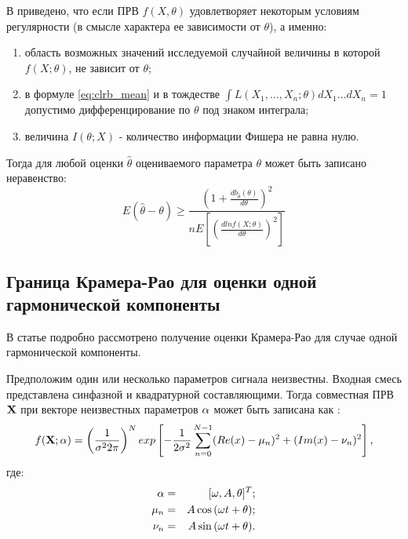 В \cite{ayvazyan-book} приведено, что если  ПРВ ${f(X, \theta)}$  
удовлетворяет некоторым  условиям регулярности (в смысле характера ее зависимости от ${\theta}$), а именно:
\begin{enumerate}
\item область возможных значений исследуемой случайной величины в которой ${f(X; \theta)}$, не зависит от ${\theta}$;
\item в формуле \ref{eq:clrb_mean} и в тождестве ${\int L(X_1, ..., X_n;\theta) dX_1...dX_n = 1}$ допустимо дифференцирование по ${\theta}$ под знаком интеграла;
\item величина ${I(\theta; X)}$ - количество информации Фишера не равна нулю.
\end{enumerate}

Тогда для любой оценки ${\hat{\theta}}$ оцениваемого параметра ${\theta}$ может быть записано неравенство:
\begin{equation}
	\label{eq:crlb_base3}
	E(\hat{\theta} - \theta) \ge \frac{(1 + \frac{d b_{\hat{\theta}} (\theta)}{d \theta})^2}{n E \left[ \left( \frac{d ln f(X; \theta)}{d \theta} \right)^2 \right]}
\end{equation}

\subsection{Граница Крамера-Рао для оценки одной гармонической компоненты}
В статье \cite{rife-crlb-article} подробно рассмотрено получение оценки Крамера-Рао для случае одной гармонической компоненты.

Предположим один или несколько параметров сигнала неизвестны. Входная смесь представлена синфазной и квадратурной составляющими. Тогда совместная ПРВ ${\bf{X}}$
при векторе неизвестных параметров ${\bf{\alpha}}$  может быть записана как \cite{rife-crlb-article}:
\begin{equation}
	\label{eq:clrb_pdf}
	f({\bf{X}}; {\bf{\alpha}}) = \left( \frac{1}{\sigma^2 2 \pi} \right)^N exp \left[ -\frac{1}{2\sigma^2} \sum_{n=0}^{N-1} (Re(x)-\mu_n)^2 + (Im(x) - \nu_n)^2 \right],
\end{equation}
где:
\begin{eqnarray}
	\label{eq:clrb_alpha}
	{\bf{\alpha}} & = & [\omega, A, \theta]^T; \\
	\mu_n & = & A \cos{(\omega t + \theta)}; \\
	\nu_n & = & A \sin{(\omega t + \theta)}.
\end{eqnarray}

